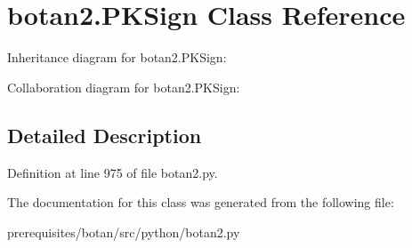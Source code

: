 \hypertarget{classbotan2_1_1_p_k_sign}{}\section{botan2.\+P\+K\+Sign Class Reference}
\label{classbotan2_1_1_p_k_sign}


Inheritance diagram for botan2.\+P\+K\+Sign\+:


Collaboration diagram for botan2.\+P\+K\+Sign\+:


\subsection{Detailed Description}


Definition at line 975 of file botan2.\+py.



The documentation for this class was generated from the following file\+:\begin{DoxyCompactItemize}
\item 
prerequisites/botan/src/python/botan2.\+py\end{DoxyCompactItemize}
